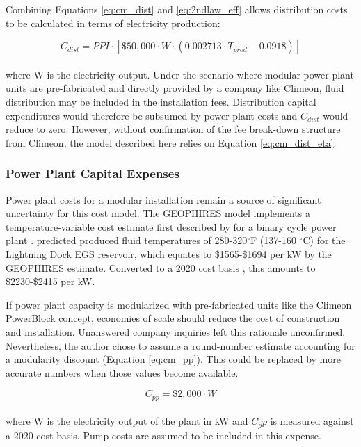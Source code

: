Combining Equations \ref{eq:cm_dist} and \ref{eq:2ndlaw_eff} allows distribution costs to be calculated in terms of electricity production:

\begin{equation}
\label{eq:cm_dist_eta}
    C_{dist} = PPI \cdot \left[ \$50,000 \cdot W \cdot (0.002713 \cdot T_{prod} - 0.0918) \right]
\end{equation}
\\
where W is the electricity output. Under the scenario where modular power plant units are pre-fabricated and directly provided by a company like Climeon, fluid distribution may be included in the installation fees. Distribution capital expenditures would therefore be subsumed by power plant costs and $C_{dist}$ would reduce to zero. However, without confirmation of the fee break-down structure from Climeon, the model described here relies on Equation \ref{eq:cm_dist_eta}. 

\subsubsection{Power Plant Capital Expenses}
\label{ch4:cm_capex_pp}

Power plant costs for a modular installation remain a source of significant uncertainty for this cost model. The GEOPHIRES model implements a temperature-variable cost estimate first described by \citet{tester_future_2006} for a binary cycle power plant \citep{beckers_introducing_2013}. \citet{schochet_development_2001} predicted produced fluid temperatures of 280-320$^\circ$F (137-160 $^\circ$C) for the Lightning Dock EGS reservoir, which equates to \$1565-\$1694 per kW by the GEOPHIRES estimate. Converted to a 2020 cost basis \citep{us_bls_ppi_2021}, this amounts to \$2230-\$2415 per kW.

If power plant capacity is modularized with pre-fabricated units like the Climeon PowerBlock concept, economies of scale should reduce the cost of construction and installation. Unanswered company inquiries left this rationale unconfirmed. Nevertheless, the author chose to assume a round-number estimate accounting for a modularity discount (Equation \ref{eq:cm_pp}). This could be replaced by more accurate numbers when those values become available.

\begin{equation}
\label{eq:cm_pp}
    C_{pp} = \$2,000 \cdot W
\end{equation}
\\
where W is the electricity output of the plant in kW and $C_pp$ is measured against a 2020 cost basis. Pump costs are assumed to be included in this expense.


